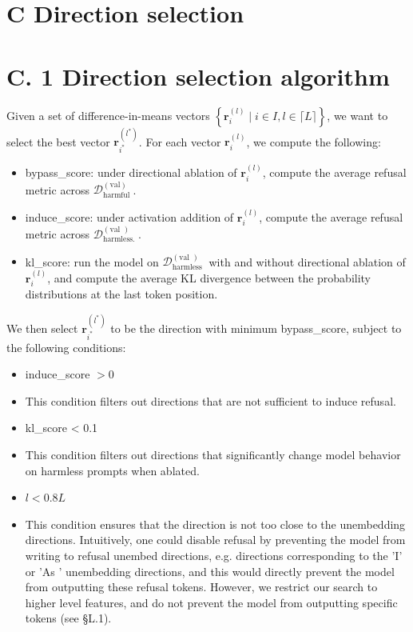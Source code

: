\documentclass[10pt]{article}
\begin{document}
\section*{C Direction selection}
\section*{C. 1 Direction selection algorithm}
Given a set of difference-in-means vectors $\left\{\mathbf{r}_{i}^{(l)} \mid i \in I, l \in\lceil L\rceil\right\}$, we want to select the best vector $\mathbf{r}_{i^{*}}^{\left(l^{*}\right)}$. For each vector $\mathbf{r}_{i}^{(l)}$, we compute the following:

\begin{itemize}
  \item bypass\_score: under directional ablation of $\mathbf{r}_{i}^{(l)}$, compute the average refusal metric across $\mathcal{D}_{\text {harmful }}^{(\mathrm{val})}$.
  \item induce\_score: under activation addition of $\mathbf{r}_{i}^{(l)}$, compute the average refusal metric across $\mathcal{D}_{\text {harmless. }}^{(\text {val })}$.
  \item kl\_score: run the model on $\mathcal{D}_{\text {harmless }}^{(\text {val })}$ with and without directional ablation of $\mathbf{r}_{i}^{(l)}$, and compute the average KL divergence between the probability distributions at the last token position.
\end{itemize}

We then select $\mathbf{r}_{i^{*}}^{\left(l^{*}\right)}$ to be the direction with minimum bypass\_score, subject to the following conditions:

\begin{itemize}
  \item induce\_score $>0$
  \item This condition filters out directions that are not sufficient to induce refusal.
  \item kl\_score < 0.1
  \item This condition filters out directions that significantly change model behavior on harmless prompts when ablated.
  \item $l<0.8 L$
  \item This condition ensures that the direction is not too close to the unembedding directions. Intuitively, one could disable refusal by preventing the model from writing to refusal unembed directions, e.g. directions corresponding to the 'I' or 'As ' unembedding directions, and this would directly prevent the model from outputting these refusal tokens. However, we restrict our search to higher level features, and do not prevent the model from outputting specific tokens (see §L.1).
\end{itemize}
\end{document}
